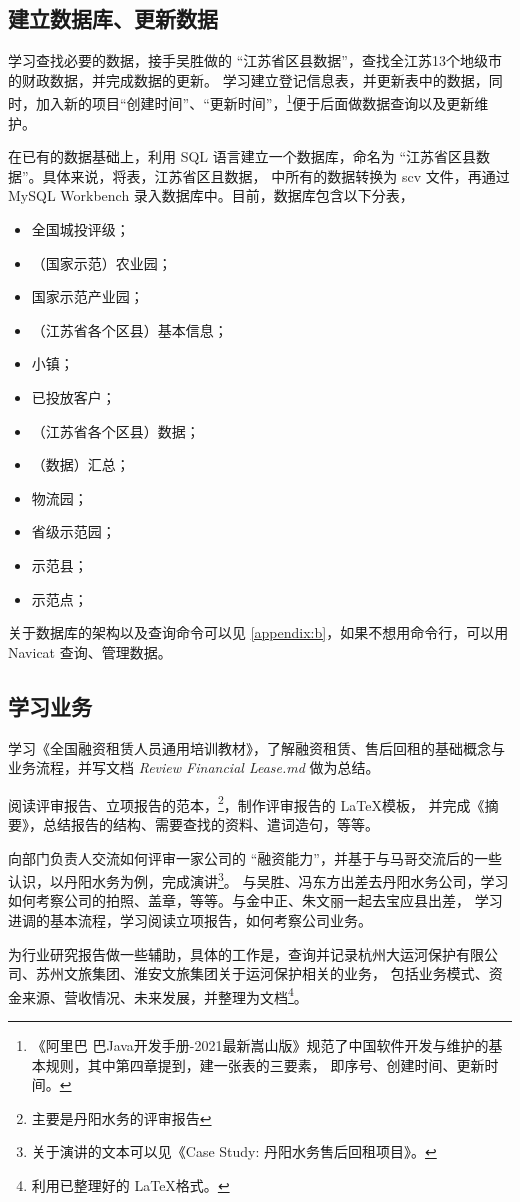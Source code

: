 \documentclass[UTF8,AutoFakeBold]{ctexart}
\begin{document}
\subsection{建立数据库、更新数据}
学习查找必要的数据，接手吴胜做的 “江苏省区县数据”，查找全江苏13个地级市的财政数据，并完成数据的更新。
学习建立登记信息表，并更新表中的数据，同时，加入新的项目“创建时间”、“更新时间”，\footnote{《阿里巴
巴Java开发手册-2021最新嵩山版》规范了中国软件开发与维护的基本规则，其中第四章提到，建一张表的三要素，
即序号、创建时间、更新时间。}便于后面做数据查询以及更新维护。
\par 
在已有的数据基础上，利用 SQL 语言建立一个数据库，命名为 “江苏省区县数据”。具体来说，将表，江苏省区且数据，
中所有的数据转换为 scv 文件，再通过 MySQL Workbench 录入数据库中。目前，数据库包含以下分表，
\begin{itemize}
    \item 全国城投评级；
    \item （国家示范）农业园；
    \item 国家示范产业园；
    \item （江苏省各个区县）基本信息；
    \item 小镇；
    \item 已投放客户；
    \item （江苏省各个区县）数据；
    \item （数据）汇总；
    \item 物流园；
    \item 省级示范园；
    \item 示范县；
    \item 示范点；
\end{itemize}

关于数据库的架构以及查询命令可以见 \cref{appendix:b}，如果不想用命令行，可以用 Navicat 查询、管理数据。

\subsection{学习业务}
学习《全国融资租赁人员通用培训教材》，了解融资租赁、售后回租的基础概念与业务流程，并写文档
\textit{Review Financial Lease.md} 做为总结。\par
阅读评审报告、立项报告的范本，\footnote{\fangsong 主要是丹阳水务的评审报告}，制作评审报告的 \LaTeX 模板，
并完成《摘要》，总结报告的结构、需要查找的资料、遣词造句，等等。\par 
向部门负责人交流如何评审一家公司的 “融资能力”，并基于与马哥交流后的一些认识，以丹阳水务为例，完成演讲\footnote{\fangsong 
关于演讲的文本可以见《Case Study: 丹阳水务售后回租项目》。}。
与吴胜、冯东方出差去丹阳水务公司，学习如何考察公司的拍照、盖章，等等。与金中正、朱文丽一起去宝应县出差，
学习进调的基本流程，学习阅读立项报告，如何考察公司业务。\par 
为行业研究报告做一些辅助，具体的工作是，查询并记录杭州大运河保护有限公司、苏州文旅集团、淮安文旅集团关于运河保护相关的业务，
包括业务模式、资金来源、营收情况、未来发展，并整理为文档\footnote{利用已整理好的 \LaTeX 格式。}。
\end{document}
